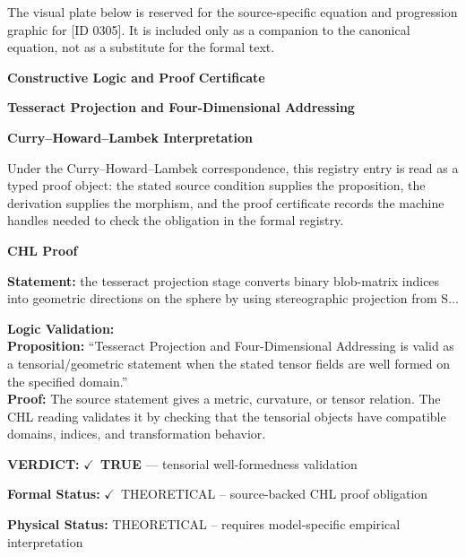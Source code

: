 \begingroup\footnotesize\sloppy
The visual plate below is reserved for the source-specific equation and progression graphic for [ID 0305]. It is included only as a companion to the canonical equation, not as a substitute for the formal text.
\par\endgroup
\ifTZPDarkEdition
{}
\fi

\clearpage
\begingroup\tzpsupportsetup
\noindent\textbf{\fontsize{10.8pt}{12.8pt}\selectfont [ID 0305] Constructive Logic and Proof Certificate}\par
\noindent\textbf{\fontsize{10pt}{12pt}\selectfont Tesseract Projection and Four-Dimensional Addressing}\par
\vspace{0.45em}
\begingroup
\footnotesize
\setlength{\parskip}{0.22em}
\setlength{\parindent}{0pt}
\noindent\textbf{Curry--Howard--Lambek Interpretation}\par
Under the Curry--Howard--Lambek correspondence, this registry entry is read as a typed proof
object: the stated source condition supplies the proposition, the derivation supplies the
morphism, and the proof certificate records the machine handles needed to check the obligation
in the formal registry.

\vspace{0.45em}
\noindent\textbf{CHL Proof}\par
\textbf{Statement:} the tesseract projection stage converts binary blob-matrix indices into geometric
directions on the sphere by using stereographic projection from S...

\textbf{Logic Validation:}\\
\textbf{Proposition:} ``Tesseract Projection and Four-Dimensional Addressing is valid as a tensorial/geometric
statement when the stated tensor fields are well formed on the specified domain.''\\
\textbf{Proof:} The source statement gives a metric, curvature, or tensor relation. The CHL reading
validates it by checking that the tensorial objects have compatible domains, indices,
and transformation behavior.

\textbf{VERDICT:} \ensuremath{\checkmark}\ \textbf{TRUE} --- tensorial well-formedness validation

\textbf{Formal Status:} \ensuremath{\checkmark}\ THEORETICAL -- source-backed CHL proof obligation

\textbf{Physical Status:} THEORETICAL -- requires model-specific empirical interpretation
\par\vspace{0.45em}
\par
\ifTZPDarkEdition
{}
\fi
\endgroup
\endgroup
